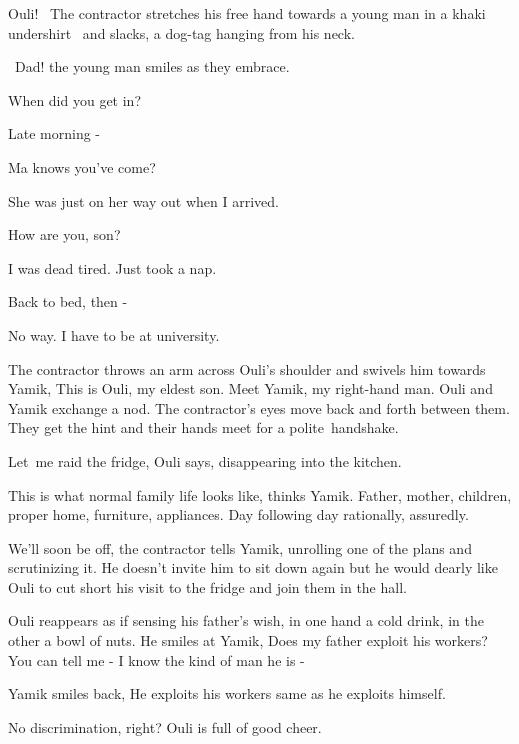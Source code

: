 \documentclass[letterpaper]{article}
\begin{document}
{\textquotedbl}Ouli!{\textquotedbl} \ The contractor stretches his free hand towards a young man in a khaki undershirt
{\ }and slacks,{ }a dog-tag hanging from his neck.

~{\textquotedbl}Dad!{\textquotedbl} the young man smiles as they embrace. 

{\textquotedbl}When did you get in?{\textquotedbl} 

{\textquotedbl}Late morning -{\textquotedbl} 

{\textquotedbl}Ma knows you've come?{\textquotedbl} 

{\textquotedbl}She was just on her way out when I arrived.{\textquotedbl} 

{\textquotedbl}How are you, son?{\textquotedbl} 

{\textquotedbl}I was dead tired. Just took a nap.{\textquotedbl} 

{\textquotedbl}Back to bed, then -{\textquotedbl} 

{\textquotedbl}No way. I have to be at university.{\textquotedbl} 

The contractor throws an arm across Ouli's shoulder and swivels him towards Yamik, {\textquotedbl}This is Ouli, my
eldest son. Meet Yamik, my right-hand man.{\textquotedbl} Ouli and Yamik exchange a nod. The contractor's eyes move
back and forth between them. They get the hint and their hands meet for a polite~handshake. 

{\textquotedbl}Let~me raid the fridge,{\textquotedbl} Ouli says, disappearing into the kitchen. 

This is what normal family life looks like, thinks Yamik. Father, mother, children, proper home, furniture, appliances.
Day following day rationally, assuredly.

{\textquotedbl}We'll soon be off,{\textquotedbl} the contractor tells Yamik, unrolling one of the plans and scrutinizing
it. He doesn't invite him to sit down again but he would dearly like Ouli to cut short his visit to the fridge and join
them in the hall.

Ouli reappears as if sensing his father's wish, in one hand a cold drink, in the other a bowl of nuts. He smiles at
Yamik, {\textquotedbl}Does my father exploit his workers? You can tell me - I know the kind of man he is
-{\textquotedbl} 

Yamik smiles back, {\textquotedbl}He exploits his workers same as he exploits himself.{\textquotedbl} 

{\textquotedbl}No discrimination, right?{\textquotedbl} Ouli is full of good cheer.
\end{document}

